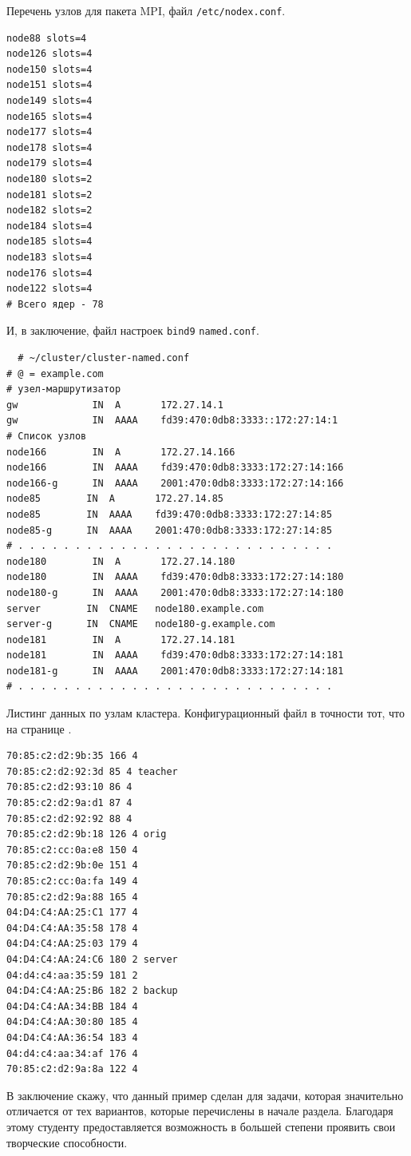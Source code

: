 \documentclass[12pt]{article}
\begin{document}
Перечень узлов для пакета MPI, файл \texttt{/etc/nodex.conf}.
\begin{verbatim}
node88 slots=4
node126 slots=4
node150 slots=4
node151 slots=4
node149 slots=4
node165 slots=4
node177 slots=4
node178 slots=4
node179 slots=4
node180 slots=2
node181 slots=2
node182 slots=2
node184 slots=4
node185 slots=4
node183 slots=4
node176 slots=4
node122 slots=4
# Всего ядер - 78
\end{verbatim}

И, в заключение, файл настроек \texttt{bind9} \texttt{named.conf}.
\begin{verbatim}
  # ~/cluster/cluster-named.conf
# @ = example.com
# узел-маршрутизатор
gw             IN  A       172.27.14.1
gw             IN  AAAA    fd39:470:0db8:3333::172:27:14:1
# Список узлов
node166        IN  A       172.27.14.166
node166        IN  AAAA    fd39:470:0db8:3333:172:27:14:166
node166-g      IN  AAAA    2001:470:0db8:3333:172:27:14:166
node85        IN  A       172.27.14.85
node85        IN  AAAA    fd39:470:0db8:3333:172:27:14:85
node85-g      IN  AAAA    2001:470:0db8:3333:172:27:14:85
# . . . . . . . . . . . . . . . . . . . . . . . . . . . .
node180        IN  A       172.27.14.180
node180        IN  AAAA    fd39:470:0db8:3333:172:27:14:180
node180-g      IN  AAAA    2001:470:0db8:3333:172:27:14:180
server        IN  CNAME   node180.example.com
server-g      IN  CNAME   node180-g.example.com
node181        IN  A       172.27.14.181
node181        IN  AAAA    fd39:470:0db8:3333:172:27:14:181
node181-g      IN  AAAA    2001:470:0db8:3333:172:27:14:181
# . . . . . . . . . . . . . . . . . . . . . . . . . . . .
\end{verbatim}

Листинг данных по узлам кластера. Конфигурационный файл в точности тот, что на странице \pageref{conforig}.
\begin{verbatim}
70:85:c2:d2:9b:35 166 4
70:85:c2:d2:92:3d 85 4 teacher
70:85:c2:d2:93:10 86 4
70:85:c2:d2:9a:d1 87 4
70:85:c2:d2:92:92 88 4
70:85:c2:d2:9b:18 126 4 orig
70:85:c2:cc:0a:e8 150 4
70:85:c2:d2:9b:0e 151 4
70:85:c2:cc:0a:fa 149 4
70:85:c2:d2:9a:88 165 4
04:D4:C4:AA:25:C1 177 4
04:D4:C4:AA:35:58 178 4
04:D4:C4:AA:25:03 179 4
04:D4:C4:AA:24:C6 180 2 server
04:d4:c4:aa:35:59 181 2
04:D4:C4:AA:25:B6 182 2 backup
04:D4:C4:AA:34:BB 184 4
04:D4:C4:AA:30:80 185 4
04:D4:C4:AA:36:54 183 4
04:d4:c4:aa:34:af 176 4
70:85:c2:d2:9a:8a 122 4
\end{verbatim}

В заключение скажу, что данный пример сделан для задачи, которая значительно отличается от тех вариантов, которые перечислены в начале раздела. Благодаря этому студенту предоставляется возможность в большей степени проявить свои творческие способности.
\end{document}
